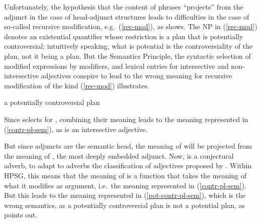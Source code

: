 \documentclass[output=paper
	        ,collection
	        ,collectionchapter
 	        ,biblatex
                ,babelshorthands
                ,newtxmath
                ,draftmode
                ,colorlinks, citecolor=brown
]{langscibook}
\begin{document}
Unfortunately, the hypothesis that the content of phrases ``projects'' from the adjunct in the case of head-adjunct structures leads to difficulties in the case of so-called recursive modification, e.g.\ (\ref{rec-mod}), as \citet{Kasper1997} shows. The NP in (\ref{rec-mod}) denotes an existential quantifier whose restriction is a plan that is potentially controversial; intuitively speaking, what is potential is the controversiality of the plan, not it being a plan. But the Semantics Principle, the syntactic selection of modified expressions by modifiers, and lexical entries for intersective and non-intersective adjectives conspire to lead to the wrong meaning for recursive modification of the kind (\ref{rec-mod}) illustrates.

\begin{exe}
\ex\label{rec-mod}a potentially controversial plan
\end{exe}

Since  selects for , combining their meaning leads to the meaning represented in (\ref{contr-pl-sem}), as  is an intersective adjective.

\begin{exe}
\ex\label{contr-pl-sem}

\end{exe}

But since adjuncts are the semantic head, the meaning of  will be projected from the meaning of , the most deeply embedded adjunct. Now,  is  a conjectural adverb, to adapt to adverbs the classification of adjectives proposed by \citet[125]{KeenanandFaltz1985}. Within HPSG, this means that the meaning of  is a function that takes the meaning of what it modifies as argument, i.e.\ the meaning represented in (\ref{contr-pl-sem}). But this leads to the meaning represented in (\ref{pot-contr-pl-sem}), which is the wrong semantics, as a potentially controversial plan is not a potential plan, as \citet[10--11]{Kasper1997} points out.
\end{document}
